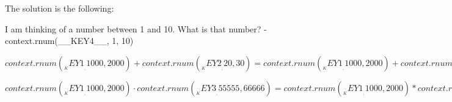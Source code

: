The solution is the following:
\begin{Solution}
\item I am thinking of a number between 1 and 10. What is that number? - {{context.rnum(__KEY4__, 1, 10)}}  
\item ${{context.rnum(__KEY1__, 1000, 2000)}} + {{context.rnum(__KEY2__, 20, 30)}} = {{context.rnum(__KEY1__, 1000, 2000) + context.rnum(__KEY2__, 20, 30)}}$ 
\item ${{context.rnum(__KEY1__, 1000, 2000)}} \cdot {{context.rnum(__KEY3__, 55555, 66666)}} = {{context.rnum(__KEY1__, 1000, 2000) * context.rnum(__KEY3__, 55555, 66666)}}$ 
\end{Solution}